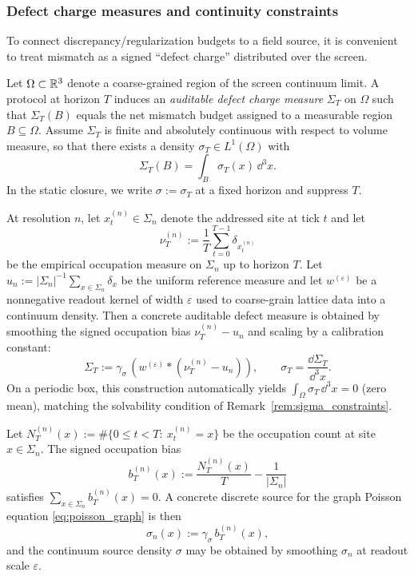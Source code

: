 \subsubsection{Defect charge measures and continuity constraints}
\label{sec:defect_charge}

To connect discrepancy/regularization budgets to a field source, it is convenient to treat mismatch as a signed ``defect charge'' distributed over the screen.

\begin{definition}
\label{def:defect_charge_sigma}
Let $\Omega\subset\mathbb{R}^3$ denote a coarse-grained region of the screen continuum limit.
A protocol at horizon $T$ induces an \emph{auditable defect charge measure} $\Sigma_T$ on $\Omega$ such that $\Sigma_T(B)$ equals the net mismatch budget assigned to a measurable region $B\subseteq\Omega$.
Assume $\Sigma_T$ is finite and absolutely continuous with respect to volume measure, so that there exists a density $\sigma_T\in L^1(\Omega)$ with
\[
\Sigma_T(B)=\int_B \sigma_T(x)\,\dd^3x.
\]
In the static closure, we write $\sigma:=\sigma_T$ at a fixed horizon and suppress $T$.
\end{definition}

\begin{example}
\label{ex:occupation_bias_sigma}
At resolution $n$, let $x_t^{(n)}\in\Sigma_n$ denote the addressed site at tick $t$ and let
\[
\nu_T^{(n)}:=\frac{1}{T}\sum_{t=0}^{T-1}\delta_{x_t^{(n)}}
\]
be the empirical occupation measure on $\Sigma_n$ up to horizon $T$.
Let $u_n:=|\Sigma_n|^{-1}\sum_{x\in\Sigma_n}\delta_x$ be the uniform reference measure and let $w^{(\varepsilon)}$ be a nonnegative readout kernel of width $\varepsilon$ used to coarse-grain lattice data into a continuum density.
Then a concrete auditable defect measure is obtained by smoothing the signed occupation bias $\nu_T^{(n)}-u_n$ and scaling by a calibration constant:
\[
\Sigma_T := \gamma_\sigma \,(w^{(\varepsilon)}\ast (\nu_T^{(n)}-u_n)),
\qquad
\sigma_T=\frac{\dd\Sigma_T}{\dd^3x}.
\]
On a periodic box, this construction automatically yields $\int_\Omega \sigma_T\,\dd^3x=0$ (zero mean), matching the solvability condition of Remark~\ref{rem:sigma_constraints}.
\end{example}

\begin{remark}
\label{rem:discrete_sigma_implementable}
Let $N_T^{(n)}(x):=\#\{0\le t<T:\ x_t^{(n)}=x\}$ be the occupation count at site $x\in\Sigma_n$.
The signed occupation bias
\[
b_T^{(n)}(x):=\frac{N_T^{(n)}(x)}{T}-\frac{1}{|\Sigma_n|}
\]
satisfies $\sum_{x\in\Sigma_n} b_T^{(n)}(x)=0$.
A concrete discrete source for the graph Poisson equation \eqref{eq:poisson_graph} is then
\[
\sigma_n(x):=\gamma_\sigma\,b_T^{(n)}(x),
\]
and the continuum source density $\sigma$ may be obtained by smoothing $\sigma_n$ at readout scale $\varepsilon$.
\end{remark}


